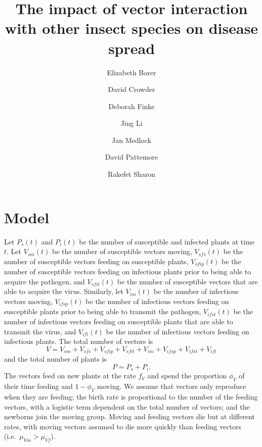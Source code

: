 \documentclass{article}
\title{The impact of vector interaction with other insect species on
  disease spread}
\author{
  Elizabeth Borer
  \and
  David Crowder
  \and
  Deborah Finke
  \and
  Jing Li
  \and
  Jan Medlock
  \and
  David Pattemore
  \and
  Rakefet Sharon
}
\begin{document}
\maketitle

\section{Model}

Let $P_s(t)$ and $P_i(t)$ be the number of susceptible and infected
plants at time $t$.  Let $V_{sm}(t)$ be the number of susceptible
vectors moving, $V_{sfs}(t)$ be the number of susceptible vectors
feeding on susceptible plants, $V_{sfip}(t)$ be the number of
susceptible vectors feeding on infectious plants prior to being able
to acquire the pathogen, and $V_{sfit}(t)$ be the number of
susceptible vectors that are able to acquire the virus.  Similarly,
let $V_{im}(t)$ be the number of infectious vectors moving,
$V_{ifsp}(t)$ be the number of infectious vectors feeding on
susceptible plants prior to being able to transmit the pathogen,
$V_{ifst}(t)$ be the number of infectious vectors feeding on
susceptible plants that are able to transmit the virus, and
$V_{ifi}(t)$ be the number of infectious vectors feeding on infectious
plants.  The total number of vectors is
\begin{equation}
  V = V_{sm} + V_{sfs} + V_{sfip} + V_{sfit} + V_{im} + V_{ifsp} +
  V_{ifst} + V_{ifi}
\end{equation}
and the total number of plants is
\begin{equation}
  P = P_s + P_i.
\end{equation}
The vectors feed on new plants at the rate $f_V$ and spend the
proportion $\phi_V$ of their time feeding and $1 - \phi_V$ moving.  We
assume that vectors only reproduce when they are feeding; the birth
rate is proportional to the number of the feeding vectors, with a
logistic term dependent on the total number of vectors; and the
newborns join the moving group.  Moving and feeding vectors die but at
different rates, with moving vectors assumed to die more quickly than
feeding vectors (i.e.~$\mu_{Vm} > \mu_{Vf}$).
\end{document}

